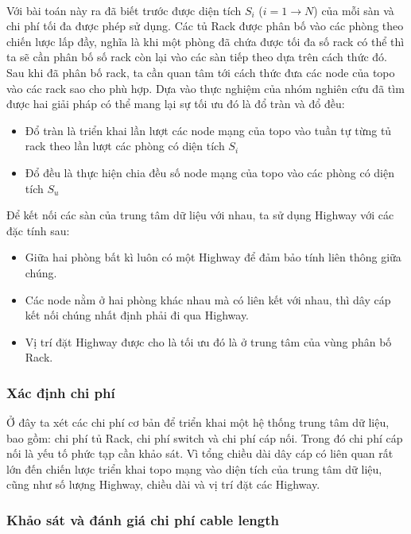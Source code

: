 \documentclass[../report.tex]{subfiles}
\begin{document}
\paragraph*{}
Với bài toán này ra đã biết trước được diện tích $S_i$ ($i = 1 \rightarrow N$) của mỗi sàn và chi phí tối đa được phép sử dụng.
Các tủ Rack được phân bố vào các phòng theo chiến lược lấp đầy, nghĩa là khi một phòng đã chứa được tối đa số rack có thể thì ta sẽ cần phân bố số rack còn lại vào các sàn tiếp theo dựa trên cách thức đó. Sau khi đã phân bố rack, ta cần quan tâm tới cách thức đưa các node của topo vào các rack sao cho phù hợp. Dựa vào thực nghiệm của nhóm nghiên cứu đã tìm được hai giải pháp có thể mang lại sự tối ưu đó là đổ tràn và đổ đều:
\begin{itemize}
        \item Đổ tràn là triển khai lần lượt các node mạng của topo vào tuần tự từng tủ rack theo lần lượt các phòng có diện tích $S_i$
        \item Đổ đều là thực hiện chia đều số node mạng của topo vào các phòng có diện tích $S_u$
\end{itemize}

Để kết nối các sàn của trung tâm dữ liệu với nhau, ta sử dụng Highway với các đặc tính sau:
\begin{itemize}
    \item Giữa hai phòng bất kì luôn có một Highway để đảm bảo tính liên thông giữa chúng.
    \item Các node nằm ở hai phòng khác nhau mà có liên kết với nhau, thì dây cáp kết nối chúng nhất định phải đi qua Highway.
    \item Vị trí đặt Highway được cho là tối ưu đó là ở trung tâm của vùng phân bố Rack.
\end{itemize}
\subsubsection{Xác định chi phí}
Ở đây ta xét các chi phí cơ bản để triển khai một hệ thống trung tâm dữ liệu, bao gồm: chi phí tủ Rack, chi phí switch và chi phí cáp nối. Trong đó chi phí cáp nối là yếu tố phức tạp cần khảo sát. Vì tổng chiều dài dây cáp có liên quan rất lớn đến chiến lược triển khai topo mạng vào diện tích của trung tâm dữ liệu, cũng như số lượng Highway, chiều dài và vị trí đặt các Highway. 

\subsubsection{Khảo sát và đánh giá chi phí cable length}
\end{document}

